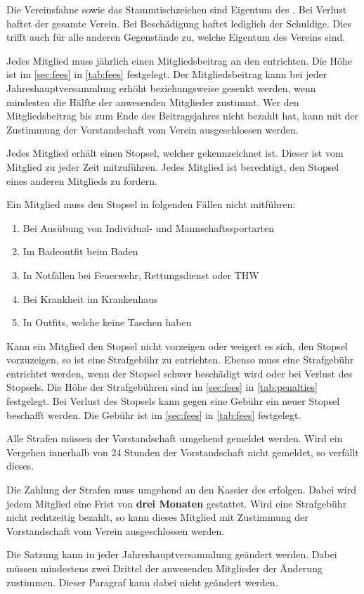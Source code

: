Die Vereinsfahne sowie das Stammtischzeichen sind Eigentum des \emph{\vereinsName}.
Bei Verlust haftet der gesamte Verein.
Bei Beschädigung haftet lediglich der Schuldige.
Dies trifft auch für alle anderen Gegenstände zu, welche Eigentum des Vereins sind.

Jedes Mitglied muss jährlich einen Mitgliedsbeitrag an den \emph{\vereinsName} entrichten.
Die Höhe ist im \autoref{sec:fees} in \autoref{tab:fees} festgelegt.
Der Mitgliedsbeitrag kann bei jeder Jahreshauptversammlung erhöht beziehungsweise gesenkt werden,
wenn mindesten die Hälfte der anwesenden Mitglieder zustimmt.
Wer den Mitgliedsbeitrag bis zum Ende des Beitragsjahres nicht bezahlt hat,
kann mit der Zustimmung der Vorstandschaft vom Verein ausgeschlossen werden.

Jedes Mitglied erhält einen Stopsel, welcher gekennzeichnet ist.
Dieser ist vom Mitglied zu jeder Zeit mitzuführen.
Jedes Mitglied ist berechtigt, den Stopsel eines anderen Mitglieds zu fordern.

Ein Mitglied muss den Stopsel in folgenden Fällen nicht mitführen:
\begin{enumerate}
    \item Bei Ausübung von Individual- und Mannschaftssportarten
    \item Im Badeoutfit beim Baden
    \item In Notfällen bei Feuerwehr, Rettungsdienst oder THW
    \item Bei Krankheit im Krankenhaus
    \item In Outfits, welche keine Taschen haben
\end{enumerate}

Kann ein Mitglied den Stopsel nicht vorzeigen oder weigert es sich,
den Stopsel vorzuzeigen, so ist eine Strafgebühr zu entrichten.
Ebenso muss eine Strafgebühr entrichtet werden, wenn der Stopsel schwer beschädigt wird
oder bei Verlust des Stopsels.
Die Höhe der Strafgebühren sind im \autoref{sec:fees} in \autoref{tab:penalties} festgelegt.
Bei Verlust des Stopsels kann gegen eine Gebühr ein neuer Stopsel beschafft werden.
Die Gebühr ist im \autoref{sec:fees} in \autoref{tab:fees} festgelegt.

Alle Strafen müssen der Vorstandschaft umgehend gemeldet werden.
Wird ein Vergehen innerhalb von 24 Stunden der Vorstandschaft nicht gemeldet,
so verfällt dieses.

Die Zahlung der Strafen muss umgehend an den Kassier des \emph{\vereinsName} erfolgen.
Dabei wird jedem Mitglied eine Frist von \textbf{drei Monaten} gestattet.
Wird eine Strafgebühr nicht rechtzeitig bezahlt,
so kann dieses Mitglied mit Zustimmung der Vorstandschaft vom Verein ausgeschlossen werden.

Die Satzung kann in jeder Jahreshauptversammlung geändert werden.
Dabei müssen mindestens zwei Drittel der anwesenden Mitglieder der Änderung zustimmen.
Dieser Paragraf kann dabei nicht geändert werden.
